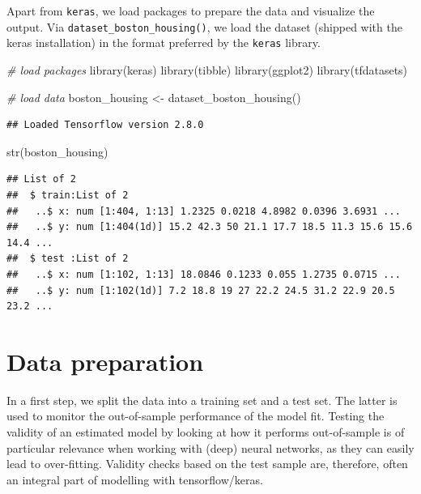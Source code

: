 \documentclass[
  12pt,
]{style/krantz}
\newenvironment{Shaded}{\begin{snugshade}}{\end{snugshade}}
\newcommand{\CommentTok}[1]{\textcolor[rgb]{0.56,0.35,0.01}{\textit{#1}}}
\newcommand{\FunctionTok}[1]{\textcolor[rgb]{0.00,0.00,0.00}{#1}}
\newcommand{\NormalTok}[1]{#1}
\newcommand{\OtherTok}[1]{\textcolor[rgb]{0.56,0.35,0.01}{#1}}
\begin{document}
Apart from \texttt{keras}, we load packages to prepare the data and visualize the output. Via \texttt{dataset\_boston\_housing()}, we load the dataset (shipped with the keras installation) in the format preferred by the \texttt{keras} library.

\begin{Shaded}
\begin{Highlighting}[]
\CommentTok{\# load packages}
\FunctionTok{library}\NormalTok{(keras)}
\FunctionTok{library}\NormalTok{(tibble)}
\FunctionTok{library}\NormalTok{(ggplot2)}
\FunctionTok{library}\NormalTok{(tfdatasets)}


\CommentTok{\# load data}
\NormalTok{boston\_housing }\OtherTok{\textless{}{-}} \FunctionTok{dataset\_boston\_housing}\NormalTok{()}
\end{Highlighting}
\end{Shaded}

\begin{verbatim}
## Loaded Tensorflow version 2.8.0
\end{verbatim}

\begin{Shaded}
\begin{Highlighting}[]
\FunctionTok{str}\NormalTok{(boston\_housing)}
\end{Highlighting}
\end{Shaded}

\begin{verbatim}
## List of 2
##  $ train:List of 2
##   ..$ x: num [1:404, 1:13] 1.2325 0.0218 4.8982 0.0396 3.6931 ...
##   ..$ y: num [1:404(1d)] 15.2 42.3 50 21.1 17.7 18.5 11.3 15.6 15.6 14.4 ...
##  $ test :List of 2
##   ..$ x: num [1:102, 1:13] 18.0846 0.1233 0.055 1.2735 0.0715 ...
##   ..$ y: num [1:102(1d)] 7.2 18.8 19 27 22.2 24.5 31.2 22.9 20.5 23.2 ...
\end{verbatim}

\hypertarget{data-preparation-1}{%
\section{Data preparation}\label{data-preparation-1}}

In a first step, we split the data into a training set and a test set. The latter is used to monitor the out-of-sample performance of the model fit. Testing the validity of an estimated model by looking at how it performs out-of-sample is of particular relevance when working with (deep) neural networks, as they can easily lead to over-fitting. Validity checks based on the test sample are, therefore, often an integral part of modelling with tensorflow/keras.
\end{document}
